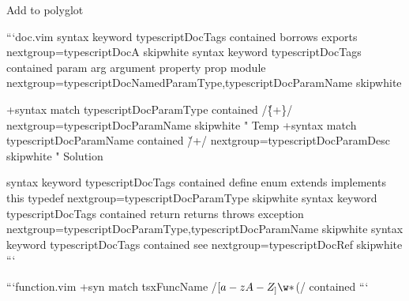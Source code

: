 Add to polyglot

```doc.vim
 syntax keyword typescriptDocTags               contained borrows exports nextgroup=typescriptDocA skipwhite
 syntax keyword typescriptDocTags               contained param arg argument property prop module nextgroup=typescriptDocNamedParamType,typescriptDocParamName skipwhite

+syntax match typescriptDocParamType contained /\v\{\w+\}/ nextgroup=typescriptDocParamName skipwhite " Temp
+syntax match typescriptDocParamName contained /\v\w+/ nextgroup=typescriptDocParamDesc skipwhite " Solution

 syntax keyword typescriptDocTags               contained define enum extends implements this typedef nextgroup=typescriptDocParamType skipwhite
 syntax keyword typescriptDocTags               contained return returns throws exception nextgroup=typescriptDocParamType,typescriptDocParamName skipwhite
 syntax keyword typescriptDocTags               contained see nextgroup=typescriptDocRef skipwhite
 ```
                                                                                                                  
```function.vim
+syn match tsxFuncName /\b\([a-zA-Z_]\w*\)\s*(/ contained
```

